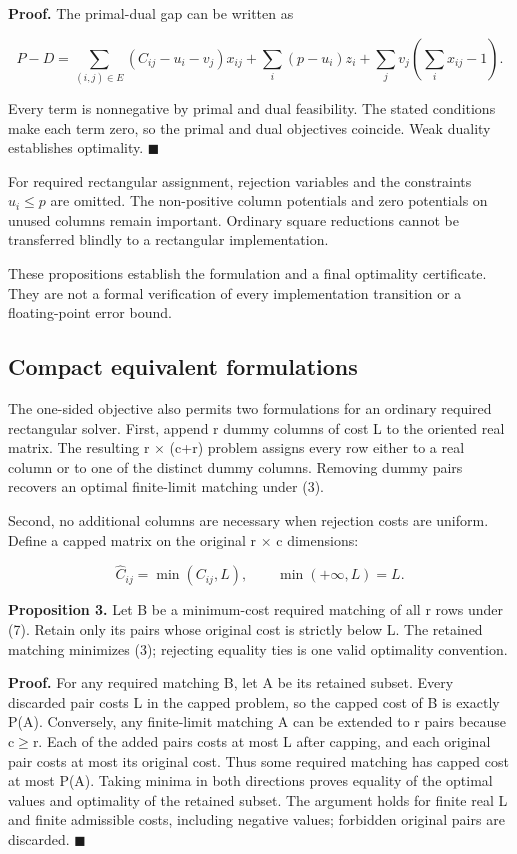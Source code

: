 \documentclass[11pt,a4paper]{article}
\begin{document}
\textbf{Proof.} The primal-dual gap can be written as

\[
P-D=
\sum_{(i,j)\in E}(C_{ij}-u_i-v_j)x_{ij}
+\sum_i(p-u_i)z_i
+\sum_jv_j\left(\sum_i x_{ij}-1\right).
\tag{6}
\]

Every term is nonnegative by primal and dual feasibility. The stated conditions make each term zero, so the primal and dual objectives coincide. Weak duality establishes optimality. \hfill\ensuremath{\blacksquare}

For required rectangular assignment, rejection variables and the constraints \(u_{i}\leq p\) are omitted. The non-positive column potentials and zero potentials on unused columns remain important. Ordinary square reductions cannot be transferred blindly to a rectangular implementation.

These propositions establish the formulation and a final optimality certificate. They are not a formal verification of every implementation transition or a floating-point error bound.

\subsection{Compact equivalent formulations}\label{sec:compact}

The one-sided objective also permits two formulations for an ordinary required rectangular solver. First, append r dummy columns of cost L to the oriented real matrix. The resulting r \ensuremath{\times} (c+r) problem assigns every row either to a real column or to one of the distinct dummy columns. Removing dummy pairs recovers an optimal finite-limit matching under (3).

Second, no additional columns are necessary when rejection costs are uniform. Define a capped matrix on the original r \ensuremath{\times} c dimensions:

\[
\widehat C_{ij}=\min(C_{ij},L),
\qquad \min(+\infty,L)=L.
\tag{7}
\]

\textbf{Proposition 3.} Let B be a minimum-cost required matching of all r rows under (7). Retain only its pairs whose original cost is strictly below L. The retained matching minimizes (3); rejecting equality ties is one valid optimality convention.

\textbf{Proof.} For any required matching B, let A be its retained subset. Every discarded pair costs L in the capped problem, so the capped cost of B is exactly P(A). Conversely, any finite-limit matching A can be extended to r pairs because c\ensuremath{\geq}r. Each of the added pairs costs at most L after capping, and each original pair costs at most its original cost. Thus some required matching has capped cost at most P(A). Taking minima in both directions proves equality of the optimal values and optimality of the retained subset. The argument holds for finite real L and finite admissible costs, including negative values; forbidden original pairs are discarded. \hfill\ensuremath{\blacksquare}
\end{document}
